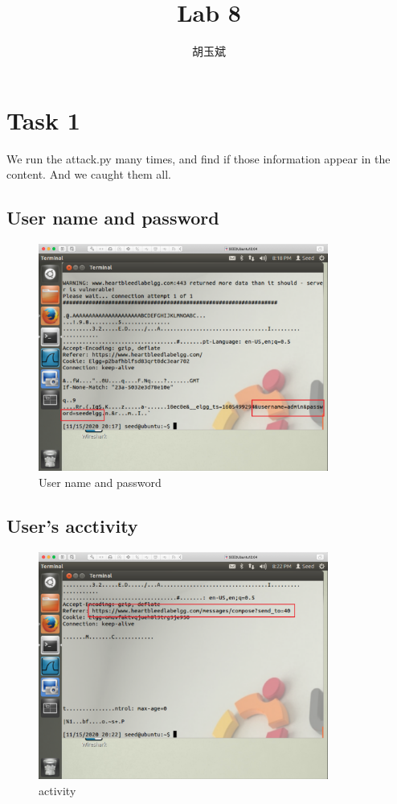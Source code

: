\documentclass[onecolumn,oneside]{SUSTechHomework}
\author{胡玉斌}
\title{Lab 8}
\begin{document}
\maketitle

\section*{Task 1}

We run the attack.py many times, and find if those information appear in the content. And we caught them all.

\subsection*{User name and password}

\begin{figure}[H]
  \centering
  \includegraphics[width=0.85\textwidth]{img/p1.png}
  \caption{User name and password}
\end{figure}

\subsection*{User's acctivity}

\begin{figure}[H]
  \centering
  \includegraphics[width=0.85\textwidth]{img/p2.png}
  \caption{activity}
\end{figure}
\end{document}
